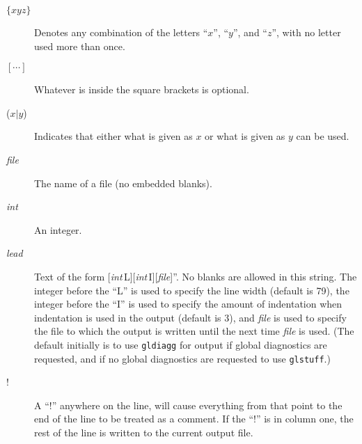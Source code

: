 \documentclass[twoside]{MATH77}
\begin{document}
\begin{description}
\item[$\{xyz\}$] Denotes any combination of the letters ``$x$'',
``$y$'', and ``$z$'', with no letter used more than once.
\item[{$[\cdots ]$}] Whatever is inside the square brackets is
optional.
\item[($x|y$)] Indicates that either what is given as $x$ or what is
given as $y$ can be used.
\item[{\em file}] The name of a file (no
embedded blanks).
\item[{\em int}]  An integer.
\item[{\em lead}] Text of the form
  [{\em int}\,L][{\em int}\,I][{\em file}]''.  No blanks are allowed in
this string.  The integer before the ``L'' is used to specify the line
width (default is 79), the integer before the ``I'' is used to specify the
amount of indentation when indentation is used in the output (default is
3), and {\em file} is used to specify the file to which the output is
written until the next time {\em file} is used. (The default initially is
to use {\tt gldiagg} for output if global diagnostics are requested, and
if no global diagnostics are requested to use {\tt glstuff}.)
\item[!] A ``!'' anywhere on the line, will cause everything from that
point to the end of the line to be treated as a comment.  If the ``!'' is
in column one, the rest of the line is written to the current output file.
\end{description}\vspace{5pt}
\end{document}

